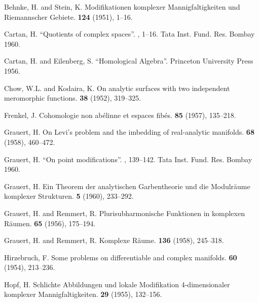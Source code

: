 \documentclass{article}
\theoremstyle{plain}
\theoremstyle{definition}
\begin{document}
\begin{thebibliography}{20}

  {\sc Behnke, H. and Stein, K.}
  \newblock Modifikationen komplexer Mannigfaltigkeiten und Riemannscher Gebiete.
   {\bf 124} (1951), 1--16.

  {\sc Cartan, H.}
  \newblock ``Quotients of complex spaces''.
  , 1--16.
  \newblock Tata Inst. Fund. Res. Bombay 1960.

  {\sc Cartan, H. and Eilenberg, S.}
  \newblock ``Homological Algebra''.
  \newblock Princeton University Press 1956.

  {\sc Chow, W.L. and Kodaira, K.}
  \newblock On analytic surfaces with two independent meromorphic functions.
   {\bf 38} (1952), 319--325.

  {\sc Frenkel, J.}
  \newblock Cohomologie non ab\'{e}linne et espaces fib\'{e}s.
   {\bf 85} (1957), 135--218.

  {\sc Grauert, H.}
  \newblock On Levi's problem and the imbedding of real-analytic manifolds.
   {\bf 68} (1958), 460--472.

  {\sc Grauert, H.}
  \newblock ``On point modifications''.
  , 139--142.
  \newblock Tata Inst. Fund. Res. Bombay 1960.

  {\sc Grauert, H.}
  \newblock Ein Theorem der analytischen Garbentheorie und die Modulr\"{a}ume komplexer Strukturen.
   {\bf 5} (1960), 233--292.

  {\sc Grauert, H. and Remmert, R.}
  \newblock Plurisubharmonische Funktionen in komplexen R\"{a}umen.
   {\bf 65} (1956), 175--194.

  {\sc Grauert, H. and Remmert, R.}
  \newblock Komplexe R\"{a}ume.
   {\bf 136} (1958), 245--318.

  {\sc Hirzebruch, F.}
  \newblock Some problems on differentiable and complex manifolds.
   {\bf 60} (1954), 213--236.

  {\sc Hopf, H.}
  \newblock Schlichte Abbildungen und lokale Modifikation 4-dimensionaler komplexer Mannigfaltigkeiten.
   {\bf 29} (1955), 132--156.


\end{thebibliography}
\end{document}
